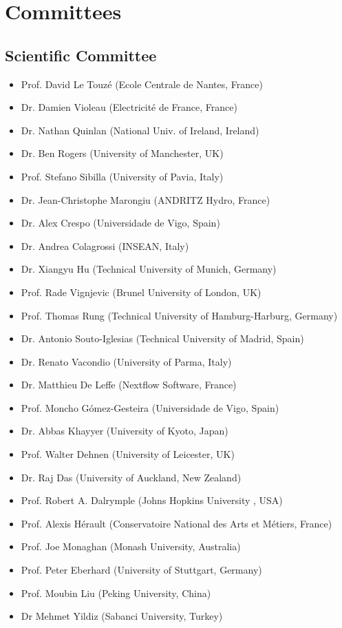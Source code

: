 \chapter*{Committees}
 \mtcaddchapter
\vspace{-5em}

\section*{Scientific Committee}\vspace{-1em}
\begin{itemize}
\item Prof. David Le Touz\'e (Ecole Centrale de Nantes, France)
\item Dr. Damien Violeau (Electricit\'e de France, France)
\item Dr. Nathan Quinlan (National Univ. of Ireland, Ireland)
\item Dr. Ben Rogers (University of Manchester, UK)
\item Prof. Stefano Sibilla (University of Pavia, Italy)
\item Dr. Jean-Christophe Marongiu (ANDRITZ Hydro, France)
\item Dr. Alex Crespo (Universidade de Vigo, Spain)
\item Dr. Andrea Colagrossi (INSEAN, Italy)
\item Dr. Xiangyu Hu (Technical University of Munich, Germany)
\item Prof. Rade Vignjevic (Brunel University of London, UK)
\item Prof. Thomas Rung (Technical University of Hamburg-Harburg, Germany)
\item Dr. Antonio Souto-Iglesias (Technical University of Madrid, Spain)
\item Dr. Renato Vacondio (University of Parma, Italy)
\item Dr. Matthieu De Leffe (Nextflow Software, France)
\item Prof. Moncho G\'omez-Gesteira (Universidade de Vigo, Spain)
\item Dr. Abbas Khayyer (University of Kyoto, Japan)
\item Prof. Walter Dehnen (University of Leicester, UK)
\item Dr. Raj Das (University of Auckland, New Zealand)
\item Prof. Robert A. Dalrymple (Johns Hopkins University , USA)
\item Prof. Alexis H\'erault (Conservatoire National des Arts et M\'etiers, France)
\item Prof. Joe Monaghan (Monash University, Australia)
\item Prof. Peter Eberhard (University of Stuttgart, Germany)
\item Prof. Moubin Liu (Peking University, China)
\item Dr Mehmet Yildiz (Sabanci University, Turkey)
\end{itemize}



